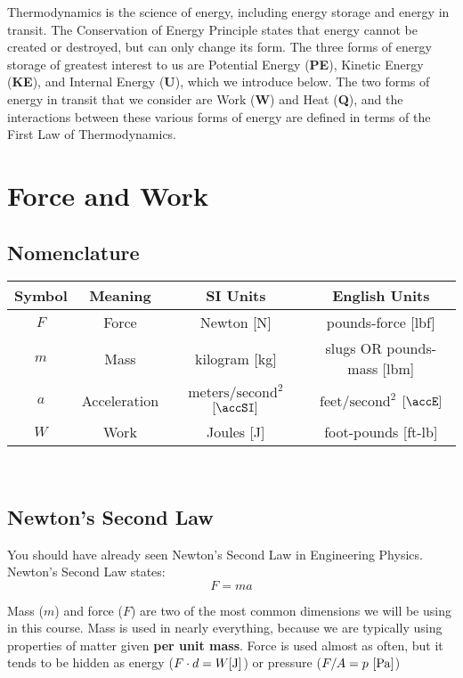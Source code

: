 Thermodynamics is the science of energy, including energy storage and energy in transit. The Conservation of Energy Principle states that energy cannot be created or destroyed, but can only change its form. The three forms of energy storage of greatest interest to us are Potential Energy ({\bf PE}), Kinetic Energy ({\bf KE}), and Internal Energy ({\bf U}), which we introduce below. The two forms of energy in transit that we consider are Work ({\bf W}) and Heat ({\bf Q}), and the interactions between these various forms of energy are defined in terms of the First Law of Thermodynamics.

\section{Force and Work}
\subsection{Nomenclature}
\begin{center}
\begin{tabular}{cccc}
  Symbol & Meaning & SI Units & English Units \\ \hline 
  $F$ & Force & Newton [N] & pounds-force [lbf] \\
  $m$ & Mass & kilogram [kg] & slugs OR pounds-mass [lbm] \\
  $a$ & Acceleration & $\text{meters}/\text{second}^2$ $[\accSI]$ & $\text{feet}/\text{second}^2$ $[\accE]$ \\
  $W$ & Work & Joules [J] & foot-pounds [ft-lb]
\end{tabular}\\
\end{center}
\subsection{Newton's Second Law}
You should have already seen Newton's Second Law in Engineering Physics.\\

Newton’s Second Law states:
\begin{equation*}
  F = m a
\end{equation*}

Mass ($m$) and force ($F$) are two of the most common dimensions we will be using in this course.  Mass is used in nearly everything, because we are typically using properties of matter given {\bf per unit mass}.  Force is used almost as often, but it tends to be hidden as energy ($F \cdot d = W [{\rm J}]$) or pressure ($F/ A = p\ [{\rm Pa}]$)

